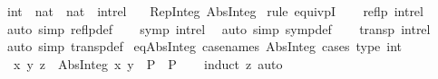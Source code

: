 \begin{isabellebody}
\isanewline
%
\endisadelimproof
\isanewline
{}\isamarkupfalse%
\ int\ {\isacharequal}{\kern0pt}\ {\isachardoublequoteopen}nat\ {\isasymtimes}\ nat{\isachardoublequoteclose}\ {\isacharslash}{\kern0pt}\ {\isachardoublequoteopen}intrel{\isachardoublequoteclose}\isanewline
\ \ \ Rep{\isacharunderscore}{\kern0pt}Integ\ Abs{\isacharunderscore}{\kern0pt}Integ\isanewline
%
\isadelimproof
%
\endisadelimproof
%
\isatagproof
{}\isamarkupfalse%
\ {\isacharparenleft}{\kern0pt}rule\ equivpI{\isacharparenright}{\kern0pt}\isanewline
\ \ \isamarkupfalse%
\ {\isachardoublequoteopen}reflp\ intrel{\isachardoublequoteclose}\ \isamarkupfalse%
\ {\isacharparenleft}{\kern0pt}auto\ simp{\isacharcolon}{\kern0pt}\ reflp{\isacharunderscore}{\kern0pt}def{\isacharparenright}{\kern0pt}\isanewline
\ \ \isamarkupfalse%
\ {\isachardoublequoteopen}symp\ intrel{\isachardoublequoteclose}\ \isamarkupfalse%
\ {\isacharparenleft}{\kern0pt}auto\ simp{\isacharcolon}{\kern0pt}\ symp{\isacharunderscore}{\kern0pt}def{\isacharparenright}{\kern0pt}\isanewline
\ \ \isamarkupfalse%
\ {\isachardoublequoteopen}transp\ intrel{\isachardoublequoteclose}\ \isamarkupfalse%
\ {\isacharparenleft}{\kern0pt}auto\ simp{\isacharcolon}{\kern0pt}\ transp{\isacharunderscore}{\kern0pt}def{\isacharparenright}{\kern0pt}\isanewline
{}\isamarkupfalse%
%
\endisatagproof
{\isafoldproof}%
%
\isadelimproof
\isanewline
%
\endisadelimproof
\isanewline
{}\isamarkupfalse%
\ eq{\isacharunderscore}{\kern0pt}Abs{\isacharunderscore}{\kern0pt}Integ\ {\isacharbrackleft}{\kern0pt}case{\isacharunderscore}{\kern0pt}names\ Abs{\isacharunderscore}{\kern0pt}Integ{\isacharcomma}{\kern0pt}\ cases\ type{\isacharcolon}{\kern0pt}\ int{\isacharbrackright}{\kern0pt}{\isacharcolon}{\kern0pt}\isanewline
\ \ {\isachardoublequoteopen}{\isacharparenleft}{\kern0pt}{\isasymAnd}x\ y{\isachardot}{\kern0pt}\ z\ {\isacharequal}{\kern0pt}\ Abs{\isacharunderscore}{\kern0pt}Integ\ {\isacharparenleft}{\kern0pt}x{\isacharcomma}{\kern0pt}\ y{\isacharparenright}{\kern0pt}\ {\isasymLongrightarrow}\ P{\isacharparenright}{\kern0pt}\ {\isasymLongrightarrow}\ P{\isachardoublequoteclose}\isanewline
%
\isadelimproof
\ \ %
\endisadelimproof
%
\isatagproof
{}\isamarkupfalse%
\ {\isacharparenleft}{\kern0pt}induct\ z{\isacharparenright}{\kern0pt}\ auto%
\endisatagproof
{\isafoldproof}%
%
\isadelimproof
%
\endisadelimproof
%
\isadelimdocument
%
\endisadelimdocument

\end{isabellebody}
